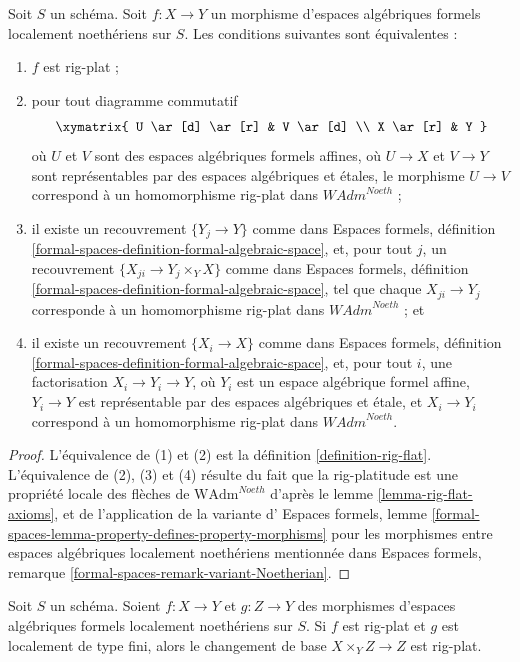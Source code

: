 \begin{lemma}
\label{lemma-rig-flat-morphisms}
Soit $S$ un schéma. Soit $f : X \to Y$ un morphisme d'espaces
algébriques formels localement noethériens sur $S$.
Les conditions suivantes sont équivalentes :
\begin{enumerate}
\item $f$ est rig-plat ;
\item pour tout diagramme commutatif
$$
\xymatrix{
U \ar[d] \ar[r] & V \ar[d] \\
X \ar[r] & Y
}
$$
où $U$ et $V$ sont des espaces algébriques formels affines, où $U \to X$ et $V \to Y$
sont représentables par des espaces algébriques et étales, le morphisme $U \to V$
correspond à un homomorphisme rig-plat dans $\textit{WAdm}^{Noeth}$ ;
\item il existe un recouvrement $\{Y_j \to Y\}$ comme dans
Espaces formels,
définition \ref{formal-spaces-definition-formal-algebraic-space},
et, pour tout $j$,
un recouvrement $\{X_{ji} \to Y_j \times_Y X\}$ comme dans
Espaces formels,
définition \ref{formal-spaces-definition-formal-algebraic-space},
tel que chaque $X_{ji} \to Y_j$ corresponde
à un homomorphisme rig-plat dans $\textit{WAdm}^{Noeth}$ ; et
\item il existe un recouvrement $\{X_i \to X\}$ comme dans
Espaces formels,
définition \ref{formal-spaces-definition-formal-algebraic-space},
et, pour tout $i$, une factorisation $X_i \to Y_i \to Y$, où $Y_i$
est un espace algébrique formel affine, $Y_i \to Y$ est représentable
par des espaces algébriques et étale, et $X_i \to Y_i$ correspond
à un homomorphisme rig-plat dans $\textit{WAdm}^{Noeth}$.
\end{enumerate}
\end{lemma}

\begin{proof}
L'équivalence de (1) et (2) est la définition \ref{definition-rig-flat}.
L'équivalence de (2), (3) et (4) résulte du fait que
la rig-platitude est une propriété locale des flèches de
$\text{WAdm}^{Noeth}$ d'après le lemme \ref{lemma-rig-flat-axioms},
et de l'application de la variante d'
Espaces formels, lemme
\ref{formal-spaces-lemma-property-defines-property-morphisms}
pour les morphismes entre espaces algébriques localement noethériens
mentionnée dans
Espaces formels, remarque
\ref{formal-spaces-remark-variant-Noetherian}.
\end{proof}

\begin{lemma}
\label{lemma-base-change-rig-flat}
Soit $S$ un schéma. Soient $f : X \to Y$ et $g : Z \to Y$
des morphismes d'espaces algébriques formels localement noethériens sur $S$.
Si $f$ est rig-plat et $g$ est localement de type fini, alors le changement de base
$X \times_Y Z \to Z$ est rig-plat.
\end{lemma}


